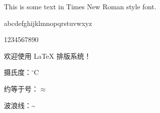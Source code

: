 \documentclass{ctexart}
\begin{document}
This is some text in Times New Roman style font.

abcdefghijklmnopqrstuvwxyz

1234567890

欢迎使用 \LaTeX{} 排版系统！


摄氏度：$^\circ$C

约等于号：$\approx$

波浪线：\~{}
\end{document}

